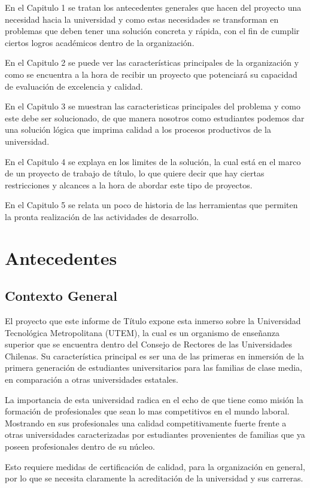 \documentclass[a4paper,12pt,openany,oneside]{book}
\begin{document}
En el Capitulo 1 se tratan los antecedentes generales que hacen del proyecto una necesidad hacia la universidad y como estas necesidades se transforman en problemas que deben tener una solución concreta y rápida, con el fin de cumplir ciertos logros académicos dentro de la organización.

En el Capitulo 2 se puede ver las características principales de la organización y como se encuentra a la hora de recibir un proyecto que potenciará su capacidad de evaluación de excelencia y calidad.

En el Capitulo 3 se muestran las caracteristicas principales del problema y como este debe ser solucionado, de que manera nosotros como estudiantes podemos dar una solución lógica que imprima calidad a los procesos productivos de la universidad.

En el Capitulo 4 se explaya en los limites de la solución, la cual está en el marco de un proyecto de trabajo de título, lo que quiere decir que hay ciertas restricciones y alcances a la hora de abordar este tipo de proyectos.

En el Capitulo 5 se relata un poco de historia de las herramientas que permiten la pronta realización de las actividades de desarrollo.
\chapter{Antecedentes}
\thispagestyle{empty}
\section{Contexto General}
El proyecto que este informe de Título expone esta inmerso sobre la Universidad Tecnológica Metropolitana (UTEM), la cual es un organismo de enseñanza superior que se encuentra dentro del Consejo de Rectores de las Universidades Chilenas. Su característica principal es ser una de las primeras en inmersión de la primera generación de estudiantes universitarios para las familias de clase media, en comparación a otras universidades estatales.

La importancia de esta universidad radica en el echo de que tiene como misión la formación de profesionales que sean lo mas competitivos en el mundo laboral. Mostrando en sus profesionales una calidad competitivamente fuerte frente a otras universidades caracterizadas por estudiantes provenientes de familias que ya poseen profesionales dentro de su núcleo.

Esto requiere medidas de certificación de calidad, para la organización en general, por lo que se necesita claramente la acreditación de la universidad y sus carreras.
\end{document}
